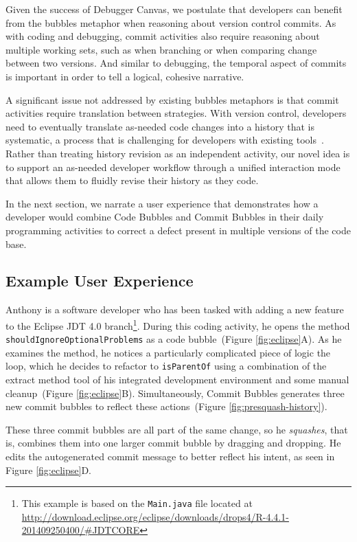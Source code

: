 \documentclass[conference]{IEEEtran}
\begin{document}
Given the success of Debugger Canvas, we postulate that developers can benefit from the bubbles metaphor when reasoning about version control commits. 
As with coding and debugging, commit activities also require reasoning about multiple working sets, such as when branching or when comparing change between two versions. 
And similar to debugging, the temporal aspect of commits is important in order to tell a logical, cohesive narrative.

A significant issue not addressed by existing bubbles metaphors is that commit activities require translation between strategies.
With version control, developers need to eventually translate as-needed code changes into a history that is systematic, a process that is challenging for developers with existing tools~\cite{PerezDeRosso2013, SausageMaking}. Rather than treating history revision as an independent activity, our novel idea is to support an as-needed developer workflow through a unified interaction mode that allows them to fluidly revise their history as they code.

In the next section, we narrate a user experience that demonstrates how a developer would combine Code Bubbles and Commit Bubbles in their daily programming activities to correct a defect present in multiple versions of the code base.

\subsection{Example User Experience}
\label{sec:userexperience}

Anthony is a software developer who has been tasked with adding a new feature to the Eclipse JDT 4.0 branch\footnote{This example is based on the \texttt{Main.java} file located at \url{http://download.eclipse.org/eclipse/downloads/drops4/R-4.4.1-201409250400/#JDTCORE}}. %
During this coding activity, he opens the method \texttt{shouldIgnoreOptionalProblems} as a code bubble~(Figure \ref{fig:eclipse}A).
As he examines the method, he notices a particularly complicated piece of logic the loop, which he decides to refactor to \texttt{isParentOf} using a combination of the extract method tool of his integrated development environment and some manual cleanup~(Figure \ref{fig:eclipse}B).
Simultaneously, Commit Bubbles generates three new commit bubbles to reflect these actions~(Figure \ref{fig:presquash-history}).

These three commit bubbles are all part of the same change, so he \textit{squashes}, that is, combines them into one larger commit bubble by dragging and dropping.
He edits the autogenerated commit message to better reflect his intent, as seen in Figure \ref{fig:eclipse}D.
\end{document}
